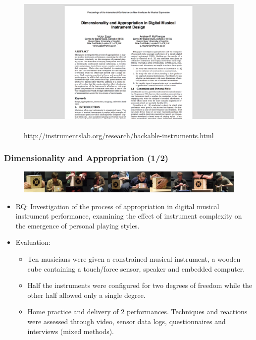 \documentclass[screen, aspectratio=169]{beamer}
\begin{document}
\begin{frame}
\frametitle{}
\begin{figure}
	\includegraphics[scale=0.31]{img/Zappi-McPherson-2014.png}\\
	    \cite{Zappi.McPherson.2014.NIME}\\
	       {\scriptsize  \url{http://instrumentslab.org/research/hackable-instruments.html}}
    \end{figure}		
\end{frame}
%
\begin{frame}
\frametitle{Dimensionality and Appropriation (1/2)}	
\begin{figure}
	\includegraphics[scale=0.31]{img/Zappi-McPherson-2014-2.png}\\
    \end{figure}	
\begin{itemize}
\item RQ: Investigation of the process of appropriation in digital musical instrument performance, examining the effect of instrument complexity on the emergence of personal playing styles.
\item Evaluation:
\begin{itemize}
\item Ten musicians were given a constrained musical instrument, a wooden cube containing a touch/force sensor, speaker and embedded computer.
\item Half the instruments were configured for two degrees of freedom while the other half allowed only a single degree.
\item Home practice and delivery of 2 performances. Techniques and reactions were assessed through video, sensor data logs, questionnaires and interviews (mixed methods).
\end{itemize}
\end{itemize}
\end{frame}
\end{document}
